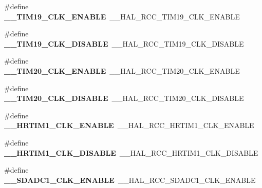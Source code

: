 \begin{DoxyCompactItemize}
\item 
\hypertarget{group___h_a_l___r_c_c___aliased_ga6e908d1b2908430d1ed2af109dd81d31}{\#define {\bfseries \-\_\-\-\_\-\-T\-I\-M19\-\_\-\-C\-L\-K\-\_\-\-E\-N\-A\-B\-L\-E}~\-\_\-\-\_\-\-H\-A\-L\-\_\-\-R\-C\-C\-\_\-\-T\-I\-M19\-\_\-\-C\-L\-K\-\_\-\-E\-N\-A\-B\-L\-E}\label{group___h_a_l___r_c_c___aliased_ga6e908d1b2908430d1ed2af109dd81d31}

\item 
\hypertarget{group___h_a_l___r_c_c___aliased_ga3b32538dedb67006d1b9c9aa210ed5f3}{\#define {\bfseries \-\_\-\-\_\-\-T\-I\-M19\-\_\-\-C\-L\-K\-\_\-\-D\-I\-S\-A\-B\-L\-E}~\-\_\-\-\_\-\-H\-A\-L\-\_\-\-R\-C\-C\-\_\-\-T\-I\-M19\-\_\-\-C\-L\-K\-\_\-\-D\-I\-S\-A\-B\-L\-E}\label{group___h_a_l___r_c_c___aliased_ga3b32538dedb67006d1b9c9aa210ed5f3}

\item 
\hypertarget{group___h_a_l___r_c_c___aliased_ga1be7819837c9d5ce89b5006858aa2c78}{\#define {\bfseries \-\_\-\-\_\-\-T\-I\-M20\-\_\-\-C\-L\-K\-\_\-\-E\-N\-A\-B\-L\-E}~\-\_\-\-\_\-\-H\-A\-L\-\_\-\-R\-C\-C\-\_\-\-T\-I\-M20\-\_\-\-C\-L\-K\-\_\-\-E\-N\-A\-B\-L\-E}\label{group___h_a_l___r_c_c___aliased_ga1be7819837c9d5ce89b5006858aa2c78}

\item 
\hypertarget{group___h_a_l___r_c_c___aliased_gac795b2f6f86b1444869608b8cdd2ded5}{\#define {\bfseries \-\_\-\-\_\-\-T\-I\-M20\-\_\-\-C\-L\-K\-\_\-\-D\-I\-S\-A\-B\-L\-E}~\-\_\-\-\_\-\-H\-A\-L\-\_\-\-R\-C\-C\-\_\-\-T\-I\-M20\-\_\-\-C\-L\-K\-\_\-\-D\-I\-S\-A\-B\-L\-E}\label{group___h_a_l___r_c_c___aliased_gac795b2f6f86b1444869608b8cdd2ded5}

\item 
\hypertarget{group___h_a_l___r_c_c___aliased_gaa8ef9aa8aac2736d3795d30295bef523}{\#define {\bfseries \-\_\-\-\_\-\-H\-R\-T\-I\-M1\-\_\-\-C\-L\-K\-\_\-\-E\-N\-A\-B\-L\-E}~\-\_\-\-\_\-\-H\-A\-L\-\_\-\-R\-C\-C\-\_\-\-H\-R\-T\-I\-M1\-\_\-\-C\-L\-K\-\_\-\-E\-N\-A\-B\-L\-E}\label{group___h_a_l___r_c_c___aliased_gaa8ef9aa8aac2736d3795d30295bef523}

\item 
\hypertarget{group___h_a_l___r_c_c___aliased_gaa4f872cf7c18f0c24f989024d5c6578f}{\#define {\bfseries \-\_\-\-\_\-\-H\-R\-T\-I\-M1\-\_\-\-C\-L\-K\-\_\-\-D\-I\-S\-A\-B\-L\-E}~\-\_\-\-\_\-\-H\-A\-L\-\_\-\-R\-C\-C\-\_\-\-H\-R\-T\-I\-M1\-\_\-\-C\-L\-K\-\_\-\-D\-I\-S\-A\-B\-L\-E}\label{group___h_a_l___r_c_c___aliased_gaa4f872cf7c18f0c24f989024d5c6578f}

\item 
\hypertarget{group___h_a_l___r_c_c___aliased_ga276bdce4ddd1f6b148ce55ccf3160500}{\#define {\bfseries \-\_\-\-\_\-\-S\-D\-A\-D\-C1\-\_\-\-C\-L\-K\-\_\-\-E\-N\-A\-B\-L\-E}~\-\_\-\-\_\-\-H\-A\-L\-\_\-\-R\-C\-C\-\_\-\-S\-D\-A\-D\-C1\-\_\-\-C\-L\-K\-\_\-\-E\-N\-A\-B\-L\-E}\label{group___h_a_l___r_c_c___aliased_ga276bdce4ddd1f6b148ce55ccf3160500}


\end{DoxyCompactItemize}

